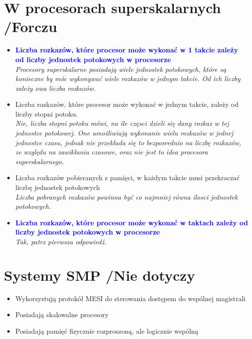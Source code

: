 \documentclass[a4paper,twoside]{article}
\begin{document}
\section{W procesorach superskalarnych {\small /Forczu}}
	\begin{itemize}
    \item \textcolor{Blue}{\textbf{Liczba rozkazów, które procesor może wykonać w 1 takcie zależy od liczby jednostek potokowych w procesorze}}\\
    {\small \emph{Procesory superskalarne posiadają wiele jednostek potokowych, które są konieczne by móc wykonywać wiele rozkazów w jednym takcie. Od ich liczby zależy owa liczba rozkazów.}}
    \item Liczba rozkazów, które procesor może wykonać w jednym takcie, zależy od liczby stopni potoku.\\
    {\small \emph{Nie, liczba stopni potoku mówi, na ile częsci dzieli się dany rozkaz w tej jednostce potokowej. One umożliwiają wykonanie wielu rozkazów w jednej jednostce czasu, jednak nie przekłada się to bezposrednio na liczbę rozkazów, ze względu na zawikłania czasowe, oraz nie jest to idea procesora superskalarnego.}}
    \item Liczba rozkazów pobieranych z pamięci, w każdym takcie musi przekraczać liczbę jednostek potokowych\\
    {\small \emph{Liczba pobranych rozkazów powinna być co najmniej równa ilosci jednostek potokowych.}}
    \item \textcolor{Blue}{\textbf{Liczba rozkazów, które procesor może wykonać w taktach zależy od liczby jednostek potokowych w procesorze}}\\
    {\small \emph{Tak, patrz pierwsza odpowiedź.}}
    \end{itemize}

\section{Systemy SMP {\small /Nie dotyczy}}
	\begin{itemize}
    \item Wykorzystują protokół MESI do sterowania dostępem do wspólnej magistrali
    \item Posiadają skalowalne procesory
    \item Posiadają pamięć fizycznie rozproszoną, ale logicznie wspólną
    \end{itemize}
\end{document}
